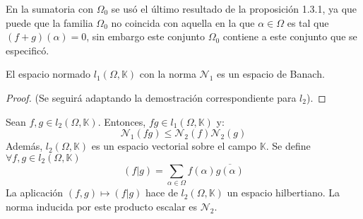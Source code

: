 \documentclass[12pt]{report}
\theoremstyle{largebreak}
\newcommand\pint[2]{\ensuremath{\left(#1\big| #2\right)}}
\newcommand\conj[1]{\ensuremath{\overline{#1}}}
\begin{document}
    \begin{obs}
        En la sumatoria con $\Omega_0$ se usó el último resultado de la proposición 1.3.1, ya que puede que la familia $\Omega_0$ no coincida con aquella en la que $\alpha\in\Omega$ es tal que $(f+g)(\alpha)=0$, sin embargo este conjunto $\Omega_0$ contiene a este conjunto que se especificó.
    \end{obs}

    \begin{theor}
        El espacio normado $l_1(\Omega,\mathbb{K})$ con la norma $\mathcal{N}_1$ es un espacio de Banach.
    \end{theor}

    \begin{proof}
        (Se seguirá adaptando la demostración correspondiente para $l_2$).
    \end{proof}

    \begin{theor}
        Sean $f,g\in l_2(\Omega,\mathbb{K})$. Entonces, $fg \in l_1(\Omega,\mathbb{K})$ y:
        \begin{equation*}
            \mathcal{N}_1(fg)\leq\mathcal{N}_2(f)\mathcal{N}_2(g)
        \end{equation*}
        Además, $l_2(\Omega,\mathbb{K})$ es un espacio vectorial sobre el campo $\mathbb{K}$. Se define $\forall f,g\in l_2(\Omega,\mathbb{K})$
        \begin{equation*}
            \pint{f}{g}=\sum_{\alpha\in\Omega}f(\alpha)\conj{g(\alpha)}
        \end{equation*}
        La aplicación $(f,g)\mapsto\pint{f}{g}$ hace de $l_2(\Omega,\mathbb{K})$ un espacio hilbertiano. La norma inducida por este producto escalar es $\mathcal{N}_2$.
    \end{theor}
\end{document}
